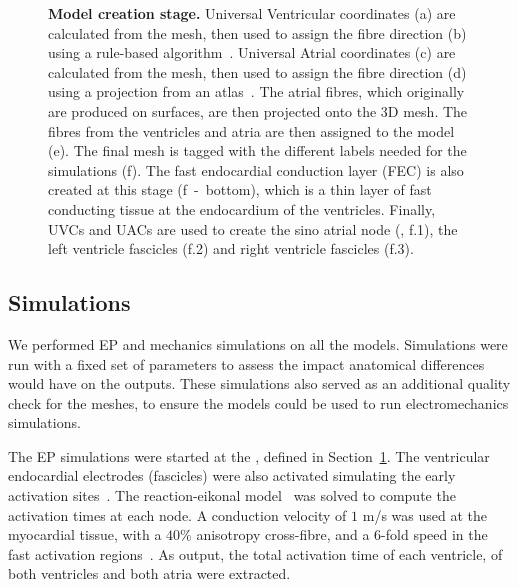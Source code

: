 \begin{figure}[hbpt]
    \caption{
        \textbf{Model creation stage. }
        Universal Ventricular coordinates (a) are calculated from the mesh, then used to assign 
        the fibre direction (b) using a rule-based algorithm~\cite{bayer2012_fibres}.
        Universal Atrial coordinates (c) are calculated from the mesh, then used to assign
        the fibre direction (d) using a projection from an atlas~\cite{Roney2021-atlas}.
        The atrial fibres, which originally are produced on surfaces, are then projected onto the 3D
        mesh.
        The fibres from the ventricles and atria are then assigned to the model (e).
        The final mesh is tagged with the different labels needed for the simulations (f).
        The fast endocardial conduction layer (FEC) is also created at this stage (f~-~bottom),
        which is a thin layer of fast conducting tissue at the endocardium of the ventricles.
        Finally, UVCs and UACs are used to create the sino atrial node (\SAN, f.1),
        the left ventricle fascicles (f.2) and right ventricle fascicles (f.3).
    }
    \label{fig:methods-model-creation}
\end{figure}

\subsection{Simulations}\label{sec:simulations}

We performed EP and mechanics simulations on all the models. 
Simulations were run with a fixed set of parameters to assess the impact 
anatomical differences would have on the outputs. 
These simulations also served as an additional quality check for the meshes, 
to ensure the models could be used to run electromechanics simulations. 

The EP simulations were started at the \SAN, defined in Section~\ref{fig:methods-model-creation}. 
The ventricular endocardial electrodes (fascicles) were also activated simulating the early activation 
sites~\cite{Gillette-2021-dt}. 
The reaction-eikonal model~\cite{neic-2017-electrograms} was solved to compute the activation 
times at each node. 
A conduction velocity of $1$ m/s was used at the myocardial tissue, with a 
$40\%$ anisotropy cross-fibre, and a 
$6$-fold speed in the fast activation regions~\cite{lee-2019-fec}. 
As output, the total activation time of each ventricle, of both ventricles and both atria were extracted.

